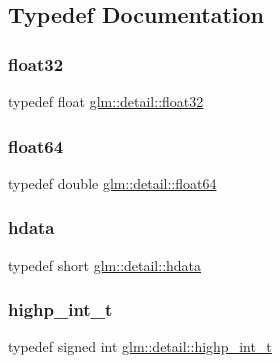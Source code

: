 \subsection{Typedef Documentation}
\mbox{\label{namespaceglm_1_1detail_ad60558c5c304624de0b54c51b5857737}} 
\subsubsection{\texorpdfstring{float32}{float32}}
{\footnotesize\ttfamily typedef float \mbox{\hyperlink{namespaceglm_1_1detail_ad60558c5c304624de0b54c51b5857737}{glm\+::detail\+::float32}}}

\mbox{\label{namespaceglm_1_1detail_a5a0a9a1be3fd5dbe6d47ae45c3022b06}} 
\subsubsection{\texorpdfstring{float64}{float64}}
{\footnotesize\ttfamily typedef double \mbox{\hyperlink{namespaceglm_1_1detail_a5a0a9a1be3fd5dbe6d47ae45c3022b06}{glm\+::detail\+::float64}}}

\mbox{\label{namespaceglm_1_1detail_aa2115f7dd38e14fea7ba9e95104120f3}} 
\subsubsection{\texorpdfstring{hdata}{hdata}}
{\footnotesize\ttfamily typedef short \mbox{\hyperlink{namespaceglm_1_1detail_aa2115f7dd38e14fea7ba9e95104120f3}{glm\+::detail\+::hdata}}}

\mbox{\label{namespaceglm_1_1detail_a74c48e9deafcc33db998a4ee62da8d6e}} 
\subsubsection{\texorpdfstring{highp\+\_\+int\+\_\+t}{highp\_int\_t}}
{\footnotesize\ttfamily typedef signed int \mbox{\hyperlink{namespaceglm_1_1detail_a74c48e9deafcc33db998a4ee62da8d6e}{glm\+::detail\+::highp\+\_\+int\+\_\+t}}}

